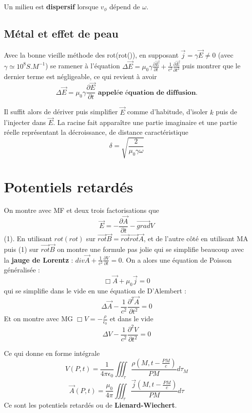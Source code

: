\documentclass[9pt]{article}
\begin{document}
\begin{multicols*}{2}
Un milieu est \textbf{dispersif} lorsque $v_\phi$ dépend de $\omega$.

\subsection{Métal et effet de peau}

Avec la bonne vieille méthode des rot(rot()), en supposant $\overrightarrow{j}= \gamma \overrightarrow{E}  \neq 0 $ (avec $\gamma \simeq 10^8 S.M^{-1}$) se ramener à l'équation
$\Delta \overrightarrow{E} = \mu_0\gamma\frac{\partial \overrightarrow{E}}{\partial t} + \frac{1}{c^2} \frac{\partial \overrightarrow{E}}{\partial t^2}$ puis montrer que le dernier terme est négligeable, ce qui revient à avoir
$$\boxed{\Delta \overrightarrow{E}=\mu_0\gamma \frac{\partial \overrightarrow{E}}{\partial t}} \textbf{ appelée équation de diffusion.}$$

Il suffit alors de dériver puis simplifier $\overrightarrow{E}$ comme d'habitude, d'isoler $k$ puis de l'injecter dans $\overrightarrow{E}$. La racine fait apparaître une partie imaginaire et une partie réelle représentant la décroissance, de distance caractéristique
$$\boxed{\delta = \sqrt{\frac{2}{\mu_0\gamma\omega}}}$$

\section{Potentiels retardés}

On montre avec MF et deux trois factorisations que
$$\overrightarrow{E} = -\frac{\partial \overrightarrow{A}}{\partial t} - \overrightarrow{grad} V$$ (1). En utilisant $rot(rot)$ sur $\overrightarrow{rot}\overrightarrow{B} = \overrightarrow{rot}\overrightarrow{rot}\overrightarrow{A}$, et de l'autre côté en utilisant MA puis (1) sur $\overrightarrow{rot}\overrightarrow{B}$ on montre une formule pas jolie qui se simplifie beaucoup avec la \textbf{jauge de Lorentz} : $div \overrightarrow{A} + \frac{1}{c^2}\frac{\partial V}{\partial t} = 0$. On a alors une équation de Poisson généralisée :
$$\Box \overrightarrow{A} + \mu_0 \overrightarrow{j}=0$$
qui se simplifie dans le vide en une équation de D'Alembert :
$$\Delta \overrightarrow{A} - \frac{1}{c^2}\frac{\partial ^2 \overrightarrow{A}}{\partial t^2} = 0$$
Et on montre avec MG $\Box V = -\frac{\rho}{\epsilon_0}$ et dans le vide
$$\Delta V - \frac{1}{c^2} \frac{ \partial ^2 V }{ \partial t^2 } = 0$$

Ce qui donne en forme intégrale
$$V(P,t) = \frac{1}{4 \pi \epsilon_0}\iiint_\tau \frac{\rho(M,t-\frac{PM}{c})}{PM}d\tau_M$$
$$\overrightarrow{A}(P,t)=\frac{\mu_0}{4\pi}\iiint_\tau \frac{\overrightarrow{j}(M,t-\frac{PM}{c})}{PM}d\tau$$
Ce sont les potentiels retardés ou de \textbf{Lienard-Wiechert}.


\end{multicols*}
\end{document}
